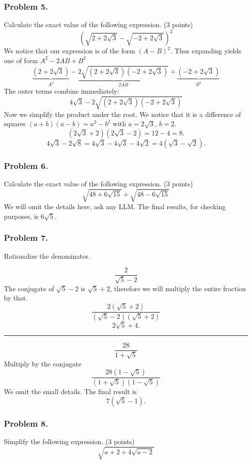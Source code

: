\documentclass{article}
\begin{document}
\subsubsection{Problem 5.}
Calculate the exact value of the following expression. (3 points)
\[
(\sqrt{2 + 2\sqrt{3}} - \sqrt{-2 +2\sqrt{3}})^2
\]
We notice that our expression is of the form $(A - B)^2$. Thus expanding yields one of form $A^2 - 2AB + B^2$
\[
\underbrace{(2 + 2\sqrt{3})}_{A^2}
-
\underbrace{2\sqrt{(2 + 2\sqrt{3})(-2 + 2\sqrt{3})}}_{2AB}
+
\underbrace{(-2 + 2\sqrt{3})}_{B^2}
\]
The outer terms combine immediately:
\[
4\sqrt{3} - 2\sqrt{(2 + 2\sqrt{3})(-2 + 2\sqrt{3})}
\]
Now we simplify the product under the root. We notice that it is a difference of squares $(a + b)(a - b) = a^2 - b^2$ with $a = 2\sqrt{3},\, b=2.$
\[
(2\sqrt{3} + 2)(2\sqrt{3} - 2) = 12 - 4 = 8.
\]
\[
4\sqrt{3} - 2\sqrt{8} = 4\sqrt{3} - 4\sqrt{3} - 4\sqrt{2} = \boxed{4(\sqrt{3} - \sqrt{2})}.
\]

\subsubsection{Problem 6.}
Calculate the exact value of the following expression. (3 points)
\[
\sqrt{48  + 6\sqrt{15}} + \sqrt{48 - 6\sqrt{15}}
\]
We will omit the details here, ask any LLM. The final results, for checking purposes, is $6\sqrt{5}.$

\subsubsection{Problem 7.}
Rationalize the denominator.

\[
\frac{2}{\sqrt{5}-2}
\]
The conjugate of $\sqrt{5}-2$ is $\sqrt{5} + 2$, therefore we will multiply the entire fraction by that.
\[
\frac{2(\sqrt{5} + 2)}{(\sqrt{5}-2)(\sqrt{5} + 2)}
\]
\[
2\sqrt{5} + 4.
\]

\vspace{3pt}
\hrule
\vspace{8pt}

\[
\frac{28}{1+\sqrt{5}}
\]
Multiply by the conjugate
\[
\frac{28(1-\sqrt{5})}{(1+\sqrt{5})(1-\sqrt{5})}
\]
We omit the small details. The final result is
\[
7(\sqrt{5} - 1).
\]

\subsubsection{Problem 8.}
Simplify the following expression. (3 points)
\[
\sqrt{a + 2 + 4\sqrt{a-2}}
\]
\end{document}
